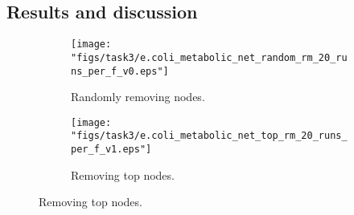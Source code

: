 \documentclass{article}
\begin{document}
\subsection{Results and discussion}

\begin{figure}[H]
	\centering
	\begin{subfigure}[b]{.49\textwidth}
		\centering
		\texttt{[image: "figs/task3/e.coli\_metabolic\_net\_random\_rm\_20\_runs\_per\_f\_v0.eps"]}
		\caption{Randomly removing nodes.}
		\label{fig:task3_rand}
	\end{subfigure}
	\begin{subfigure}[b]{.49\textwidth}
		\centering
		\texttt{[image: "figs/task3/e.coli\_metabolic\_net\_top\_rm\_20\_runs\_per\_f\_v1.eps"]}
		\caption{Removing top nodes.}
		\label{fig:task3_top}
	\end{subfigure}
\end{figure}
\end{document}
